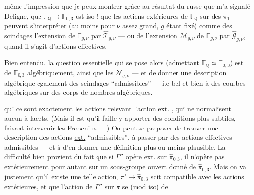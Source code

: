 même l'impression que je peux montrer grâce au résultat du russe que m'a signalé Deligne,  que $\mathbb{\Gamma}_{\mathbb Q}\longrightarrow\mathbb{\Gamma}_{0,3}$ est iso !   que les actions extérieures de $\mathbb{\Gamma}_{\mathbb Q}$ sur des $\pi_1$  peuvent s'interpréter (au moins pour $\nu$ assez grand, $g$ étant fixé) comme des scindages  l'extension  de $\mathbb{\Gamma}_{g,\nu}$ par $\widehat{\mathcal T}_{g,\nu}$ — ou de l'extension $\mathcal M_{g,\nu}$ de $\mathbb{\Gamma}_{g,\nu}$ par $\widehat{\mathcal G}_{g,\nu}$, quand il s'agit d'actions effectives.

Bien entendu, la question essentielle qui se pose alors (admettant $\mathbb{\Gamma}_{\mathbb Q}\simeq\mathbb{\Gamma}_{0,3}$) est de  $\mathbb{\Gamma}_{0,3}$ algébriquement, ainsi que les $\mathcal N_{g,\nu}$ — et de donner une description algébrique également des scindages ``admissibles'' — i.e  bel et bien à des courbes algébriques sur des corps de nombres algébriques.

qu' ce sont exactement les actions relevant l'action ext. , qui ne normalisent aucun  à lacets,  (Mais il est  qu'il faille y apporter des conditions plus subtiles, faisant intervenir les Frobenius ... ) On peut se proposer de trouver une description des actions \uline{ext.} ``admissibles'',   à passer par des actions effectives admissibles — et à \linebreak{} d'en donner une définition plus ou moins plausible. La difficulté bien  provient du fait que si $\Gamma''$ opère \uline{ext.} sur  $\widehat{\pi}_{0,3}$, il n'opère pas extérieurement pour autant sur un sous-groupe ouvert donné  de $\widehat{\pi}_{0,3}$. Mais on va  justement qu'il \uline{existe} une telle action,    $\pi'\longrightarrow\widehat{\pi}_{0,3}$ soit compatible avec les actions extérieures, et que l'action de $\Gamma''$ sur $\pi$ se  (mod iso) de

